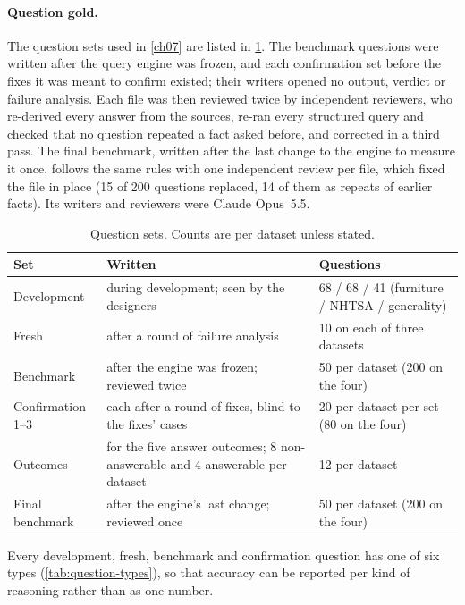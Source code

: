 \paragraph{Question gold.} The question sets used in \cref{ch07} are listed in \cref{tab:question-sets}. The
benchmark questions were written after the query engine was frozen, and each confirmation set before the
fixes it was meant to confirm existed; their writers opened no output, verdict or failure analysis. Each file
was then reviewed twice by independent reviewers, who re-derived every answer from the sources, re-ran every
structured query and checked that no question repeated a fact asked before, and corrected in a third pass. The
final benchmark, written after the last change to the engine to measure it once, follows the same rules with one
independent review per file, which fixed the file in place (15 of 200 questions replaced, 14 of them as repeats of earlier facts).
Its writers and reviewers were Claude Opus~5.5.

\begin{table}[htbp]
\centering
\caption{Question sets. Counts are per dataset unless stated.}
\label{tab:question-sets}
\small
\begin{tabularx}{\linewidth}{@{}lXl@{}}
\toprule
Set & Written & Questions \\
\midrule
Development & during development; seen by the designers & 68 / 68 / 41 (furniture / NHTSA / generality) \\
Fresh & after a round of failure analysis & 10 on each of three datasets \\
Benchmark & after the engine was frozen; reviewed twice & 50 per dataset (200 on the four) \\
Confirmation 1--3 & each after a round of fixes, blind to the fixes' cases & 20 per dataset per set (80 on the four) \\
Outcomes & for the five answer outcomes; 8 non-answerable and 4 answerable per dataset & 12 per dataset \\
Final benchmark & after the engine's last change; reviewed once & 50 per dataset (200 on the four) \\
\bottomrule
\end{tabularx}
\end{table}

Every development, fresh, benchmark and confirmation question has one of six types (\cref{tab:question-types}), so that accuracy can be reported per kind of
reasoning rather than as one number.

